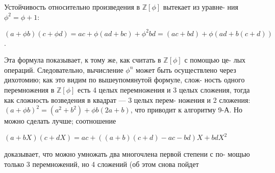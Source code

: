 Устойчивость относительно произведения в $\mathbb{Z}[\phi]$ вытекает из уравне-\linebreak
ния $\phi^2=\phi+1$:
\begin{center}
$(a+\phi b)(c+\phi d)=ac+\phi(ad+bc)+\phi^2bd=(ac+bd)+\phi(ad+b(c+d))$.
\end{center}
Эта формула показывает, к тому же, как считать в $\mathbb{Z}[\phi]$ с помощью це-\linebreak
лых операций. Следовательно, вычисление $\phi^n$ может быть осуществлено\linebreak
через дихотомию; как это видим по вышеупомянутой формуле, слож-\linebreak
ность одного перемножения в $\mathbb{Z}[\phi]$ есть 4 целых перемножения и 3 целых\linebreak
сложения, тогда как сложность возведения в квадрат — 3 целых перем-\linebreak
ножения и 2 сложения: $(a+\phi b)^2=(a^2+b^2)+\phi b(2a+b)$, что приводит\linebreak
к алгоритму 9-А.\newline
\hspace*{15pt}Но можно сделать лучше; соотношение
\begin{center}
$(a+bX)(c+dX)=ac+\left((a+b)(c+d)-ac-bd\right)X+bdX^2$
\end{center}
доказывает, что можно умножать два многочлена первой степени с по-\linebreak
мощью только 3 перемножений, но 4 сложений (об этом снова пойдет\linebreak
\newpage


